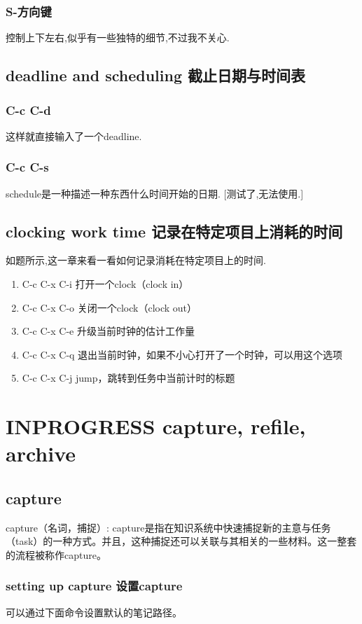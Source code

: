 \documentclass[10pt,a4paper]{article}
\begin{document}
\subsubsection{S-方向键}
\label{sec:orgb3cd156}
控制上下左右,似乎有一些独特的细节,不过我不关心.
\subsection{deadline and scheduling 截止日期与时间表}
\label{sec:orgf0ee33b}
\subsubsection{C-c C-d}
\label{sec:org742dffe}
这样就直接输入了一个deadline.

\subsubsection{C-c C-s}
\label{sec:orgd2d7739}
schedule是一种描述一种东西什么时间开始的日期.
[测试了,无法使用.]

\subsection{clocking work time 记录在特定项目上消耗的时间}
\label{sec:org9a22eb8}
如题所示,这一章来看一看如何记录消耗在特定项目上的时间.
\begin{enumerate}
\item C-c C-x C-i 打开一个clock（clock in）
\item C-c C-x C-o 关闭一个clock（clock out）
\item C-c C-x C-e 升级当前时钟的估计工作量
\item C-c C-x C-q 退出当前时钟，如果不小心打开了一个时钟，可以用这个选项
\item C-c C-x C-j jump，跳转到任务中当前计时的标题
\end{enumerate}
\section{{\bfseries\sffamily INPROGRESS} capture, refile, archive}
\label{sec:orga8d9bb2}
\subsection{capture}
\label{sec:org1571fb6}
capture（名词，捕捉）: capture是指在知识系统中快速捕捉新的主意与任务（task）的一种方式。并且，这种捕捉还可以关联与其相关的一些材料。这一整套的流程被称作capture。
\subsubsection{setting up capture 设置capture}
\label{sec:orge3f6ed4}
可以通过下面命令设置默认的笔记路径。
\end{document}
